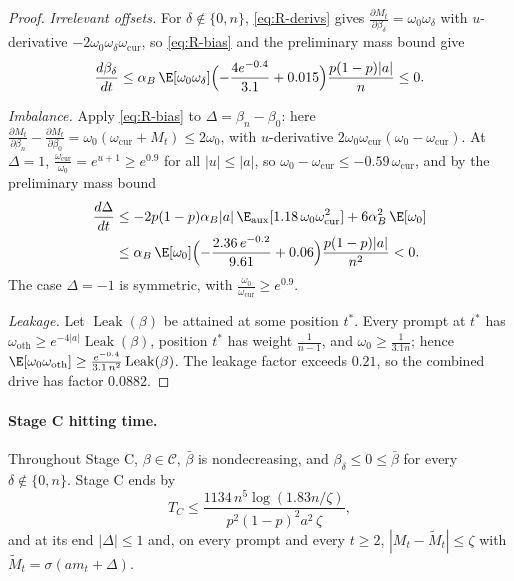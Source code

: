 \begin{proof}
\emph{Irrelevant offsets.} For $\delta\notin\{0,n\}$, \cref{eq:R-derivs} gives $\tfrac{\partial M_t}{\partial\beta_\delta}=\omega_0\omega_\delta$ with
$u$-derivative $-2\omega_0\omega_\delta \omega_{\mathrm{cur}}$, so \cref{eq:R-bias} and the preliminary mass bound give
\[
 \frac{d\beta_\delta}{dt}\le\alpha_B\,\E[\omega_0\omega_\delta]\Bigl(-\frac{4e^{-0.4}}{3.1}+0.015\Bigr)\frac{p(1-p)|a|}{n}\le0 .
\]

\emph{Imbalance.} Apply \cref{eq:R-bias} to $\Delta=\beta_n-\beta_0$: here $\tfrac{\partial M_t}{\partial\beta_n}-\tfrac{\partial M_t}{\partial\beta_0}=\omega_0(\omega_{\mathrm{cur}}+M_t)\le2\omega_0$, with $u$-derivative
$2\omega_0\omega_{\mathrm{cur}}(\omega_0-\omega_{\mathrm{cur}})$. At $\Delta=1$, $\tfrac{\omega_{\mathrm{cur}}}{\omega_0}=e^{u+1}\ge e^{0.9}$ for all
$|u|\le|a|$, so $\omega_0-\omega_{\mathrm{cur}}\le-0.59\,\omega_{\mathrm{cur}}$, and by the preliminary mass bound
\begin{align*}
 \frac{d\Delta}{dt}&\le-2p(1-p)\alpha_B|a|\,\E_{\mathrm{aux}}[1.18\,\omega_0\omega_{\mathrm{cur}}^2]+6\alpha_B^2\,\E[\omega_0]\\
 &\le\alpha_B\,\E[\omega_0]\Bigl(-\frac{2.36\,e^{-0.2}}{9.61}+0.06\Bigr)\frac{p(1-p)|a|}{n^2}<0.
\end{align*}
The case $\Delta=-1$ is symmetric, with $\tfrac{\omega_0}{\omega_{\mathrm{cur}}}\ge e^{0.9}$.

\emph{Leakage.} Let $\operatorname{Leak}(\beta)$ be attained at some position $t^*$. Every prompt at $t^*$ has $\omega_{\mathrm{oth}}\ge e^{-4|a|}\operatorname{Leak}(\beta)$, position $t^*$
has weight $\tfrac1{n-1}$, and $\omega_0\ge\tfrac1{3.1n}$; hence $\E[\omega_0\omega_{\mathrm{oth}}]\ge\tfrac{e^{-0.4}}{3.1\,n^2}\operatorname{Leak}(\beta)$.
The leakage factor exceeds $0.21$, so the combined drive has factor $0.0882$.
\end{proof}

\paragraph{Stage C hitting time.}
\begin{lemma}[Stage C]
\label{lem:R-C}
Throughout Stage C, $\beta\in\mathcal C$, $\bar\beta$ is nondecreasing, and $\beta_\delta\le0\le\bar\beta$ for every $\delta\notin\{0,n\}$. Stage C
ends by
\[
 T_C\le\frac{1134\,n^5\log(1.83n/\zeta)}{p^2(1-p)^2a^2\,\zeta},
\]
and at its end $|\Delta|\le1$ and, on every prompt and every $t\ge2$, $|M_t-\widetilde M_t|\le\zeta$ with
$\widetilde M_t=\sigma(am_t+\Delta)$.
\end{lemma}

